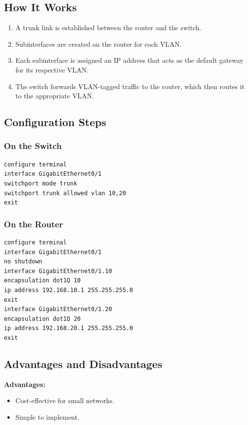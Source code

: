 \documentclass[a4paper]{book}
\begin{document}
\subsection{How It Works}
\begin{enumerate}
    \item A trunk link is established between the router and the switch.
    \item Subinterfaces are created on the router for each VLAN.
    \item Each subinterface is assigned an IP address that acts as the default gateway for its respective VLAN.
    \item The switch forwards VLAN-tagged traffic to the router, which then routes it to the appropriate VLAN.
\end{enumerate}

\subsection{Configuration Steps}
\subsubsection{On the Switch}
\begin{lstlisting}
configure terminal
interface GigabitEthernet0/1
switchport mode trunk
switchport trunk allowed vlan 10,20
exit
\end{lstlisting}

\subsubsection{On the Router}
\begin{lstlisting}
configure terminal
interface GigabitEthernet0/1
no shutdown
interface GigabitEthernet0/1.10
encapsulation dot1Q 10
ip address 192.168.10.1 255.255.255.0
exit
interface GigabitEthernet0/1.20
encapsulation dot1Q 20
ip address 192.168.20.1 255.255.255.0
exit
\end{lstlisting}

\subsection{Advantages and Disadvantages}
\textbf{Advantages:}
\begin{itemize}
    \item Cost-effective for small networks.
    \item Simple to implement.
\end{itemize}
\end{document}
